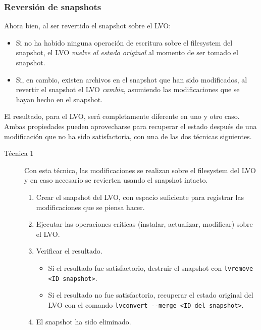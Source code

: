 \subsubsection{Reversión de snapshots}
Ahora bien, al ser revertido el snapshot sobre el LVO:
\begin{itemize}
	\item Si no ha habido ninguna operación de escritura sobre el filesystem del snapshot, el LVO \emph{vuelve al estado original} al momento de ser tomado el snapshot. 
	\item Si, en cambio, existen archivos en el snapshot que han sido modificados, al revertir el snapshot el LVO \emph{cambia}, asumiendo las modificaciones que se hayan hecho en el snapshot. 
\end{itemize}

El resultado, para el LVO, será completamente diferente en uno y otro caso. Ambas propiedades pueden aprovecharse para recuperar el estado después de una modificación que no ha sido satisfactoria, con una de las dos técnicas siguientes.


\begin{description}
\item [Técnica 1] Con esta técnica, las modificaciones se realizan sobre el filesystem del LVO y en caso necesario se revierten usando el snapshot intacto. 
\begin{enumerate}
	\item Crear el snapshot del LVO, con espacio suficiente para registrar las modificaciones que se piensa hacer.
	\item Ejecutar las operaciones críticas (instalar, actualizar, modificar) sobre el LVO.
	\item Verificar el resultado.
	\begin{itemize}
		\item Si el resultado fue satisfactorio, destruir el snapshot con \lstinline$lvremove <ID snapshot>$. 
		\item Si el resultado no fue satisfactorio, recuperar el estado original del LVO con el comando \lstinline$lvconvert --merge <ID del snapshot>$.
	\end{itemize}
	\item El snapshot ha sido eliminado.
\end{enumerate}
\end{description}

